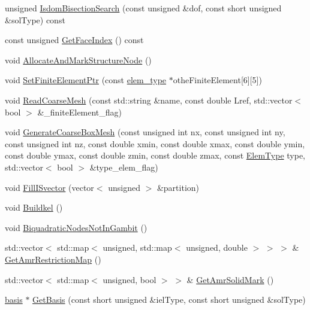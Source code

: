 \begin{DoxyCompactItemize}
\item 
unsigned \mbox{\hyperlink{classfemus_1_1_mesh_afe41a9d6d4c7eacad589a75ed49574e3}{Isdom\+Bisection\+Search}} (const unsigned \&dof, const short unsigned \&sol\+Type) const
\item 
const unsigned \mbox{\hyperlink{classfemus_1_1_mesh_acc7eefc6288f04c47598abd8ea08471c}{Get\+Face\+Index}} () const
\item 
void \mbox{\hyperlink{classfemus_1_1_mesh_a45401932c540047981f9b9a6f0c614c0}{Allocate\+And\+Mark\+Structure\+Node}} ()
\item 
void \mbox{\hyperlink{classfemus_1_1_mesh_ae094f313c8fdcb6add08328253a009cd}{Set\+Finite\+Element\+Ptr}} (const \mbox{\hyperlink{classfemus_1_1elem__type}{elem\+\_\+type}} $\ast$othe\+Finite\+Element\mbox{[}6\mbox{]}\mbox{[}5\mbox{]})
\item 
void \mbox{\hyperlink{classfemus_1_1_mesh_adefc4c81e228e9d3267583c33da32b01}{Read\+Coarse\+Mesh}} (const std\+::string \&name, const double Lref, std\+::vector$<$ bool $>$ \&\+\_\+finite\+Element\+\_\+flag)
\item 
void \mbox{\hyperlink{classfemus_1_1_mesh_a0ac9ef39a592ef9cfddb8bb4aae995b1}{Generate\+Coarse\+Box\+Mesh}} (const unsigned int nx, const unsigned int ny, const unsigned int nz, const double xmin, const double xmax, const double ymin, const double ymax, const double zmin, const double zmax, const \mbox{\hyperlink{_elem_type_enum_8hpp_a1b014294b9757a001707c979e2bab627}{Elem\+Type}} type, std\+::vector$<$ bool $>$ \&type\+\_\+elem\+\_\+flag)
\item 
void \mbox{\hyperlink{classfemus_1_1_mesh_ae9899737d77417df9527e6a9a59d02e5}{Fill\+I\+Svector}} (vector$<$ unsigned $>$ \&partition)
\item 
void \mbox{\hyperlink{classfemus_1_1_mesh_a3ee594bef27d2d809211d3eb7d26e773}{Buildkel}} ()
\item 
void \mbox{\hyperlink{classfemus_1_1_mesh_a3445a0286d1d6d752ac8651df9cc147a}{Biquadratic\+Nodes\+Not\+In\+Gambit}} ()
\item 
std\+::vector$<$ std\+::map$<$ unsigned, std\+::map$<$ unsigned, double $>$ $>$ $>$ \& \mbox{\hyperlink{classfemus_1_1_mesh_af03a43d29cbcddb3d258be21066ce4a0}{Get\+Amr\+Restriction\+Map}} ()
\item 
std\+::vector$<$ std\+::map$<$ unsigned, bool $>$ $>$ \& \mbox{\hyperlink{classfemus_1_1_mesh_a5d9eb3aa045d016934383711debaa5f5}{Get\+Amr\+Solid\+Mark}} ()
\item 
\mbox{\hyperlink{classfemus_1_1basis}{basis}} $\ast$ \mbox{\hyperlink{classfemus_1_1_mesh_a187f3cfb2c0699d8d10935415cc2aafb}{Get\+Basis}} (const short unsigned \&iel\+Type, const short unsigned \&sol\+Type)

\end{DoxyCompactItemize}
